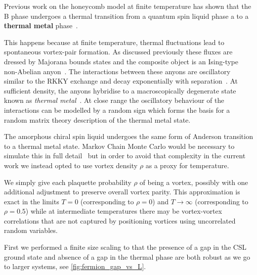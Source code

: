 Previous work on the honeycomb model at finite temperature has shown that the B phase undergoes a thermal transition from a quantum spin liquid phase a to a \textbf{thermal metal} phase~\autocite{selfThermallyInducedMetallic2019}.

This happens because at finite temperature, thermal fluctuations lead to spontaneous vortex-pair formation. As discussed previously these fluxes are dressed by Majorana bounds states and the composite object is an Ising-type non-Abelian anyon~\autocite{Beenakker2013}. The interactions between these anyons are oscillatory similar to the RKKY exchange and decay exponentially with separation~\autocite{Laumann2012,Lahtinen_2011,lahtinenTopologicalLiquidNucleation2012}. At sufficient density, the anyons hybridise to a macroscopically degenerate state known as \emph{thermal metal}~\autocite{Laumann2012}. At close range the oscillatory behaviour of the interactions can be modelled by a random sign which forms the basis for a random matrix theory description of the thermal metal state.

The amorphous chiral spin liquid undergoes the same form of Anderson transition to a thermal metal state. Markov Chain Monte Carlo would be necessary to simulate this in full detail~\autocite{selfThermallyInducedMetallic2019} but in order to avoid that complexity in the current work we instead opted to use vortex density \(\rho\) as a proxy for temperature.

We simply give each plaquette probability \(\rho\) of being a vortex, possibly with one additional adjustment to preserve overall vortex parity. This approximation is exact in the limits \(T = 0\) (corresponding to \(\rho = 0\)) and \(T \to \infty\) (corresponding to \(\rho = 0.5\)) while at intermediate temperatures there may be vortex-vortex correlations that are not captured by positioning vortices using uncorrelated random variables.

First we performed a finite size scaling to that the presence of a gap in the CSL ground state and absence of a gap in the thermal phase are both robust as we go to larger systems, see \cref{fig:fermion_gap_vs_L}.


